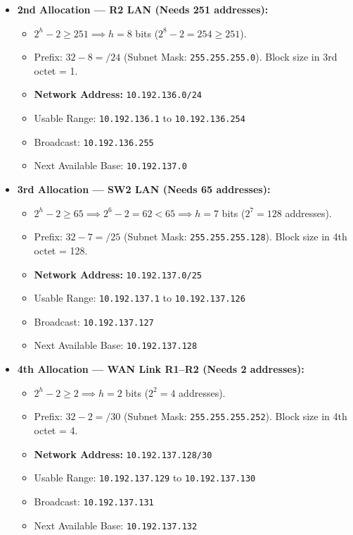 \documentclass[11pt,a4paper]{article}
\begin{document}
\begin{enumerate}
\begin{itemize}
        \item \textbf{2nd Allocation --- R2 LAN (Needs 251 addresses):}
        \begin{itemize}
            \item $2^h - 2 \ge 251 \implies h = 8$ bits ($2^8 - 2 = 254 \ge 251$).
            \item Prefix: $32 - 8 = /24$ (Subnet Mask: \texttt{255.255.255.0}). Block size in 3rd octet = 1.
            \item \textbf{Network Address:} \texttt{10.192.136.0/24}
            \item Usable Range: \texttt{10.192.136.1} to \texttt{10.192.136.254}
            \item Broadcast: \texttt{10.192.136.255}
            \item Next Available Base: \texttt{10.192.137.0}
        \end{itemize}

        \item \textbf{3rd Allocation --- SW2 LAN (Needs 65 addresses):}
        \begin{itemize}
            \item $2^h - 2 \ge 65 \implies 2^6 - 2 = 62 < 65 \implies h = 7$ bits ($2^7 = 128$ addresses).
            \item Prefix: $32 - 7 = /25$ (Subnet Mask: \texttt{255.255.255.128}). Block size in 4th octet = 128.
            \item \textbf{Network Address:} \texttt{10.192.137.0/25}
            \item Usable Range: \texttt{10.192.137.1} to \texttt{10.192.137.126}
            \item Broadcast: \texttt{10.192.137.127}
            \item Next Available Base: \texttt{10.192.137.128}
        \end{itemize}

        \item \textbf{4th Allocation --- WAN Link R1--R2 (Needs 2 addresses):}
        \begin{itemize}
            \item $2^h - 2 \ge 2 \implies h = 2$ bits ($2^2 = 4$ addresses).
            \item Prefix: $32 - 2 = /30$ (Subnet Mask: \texttt{255.255.255.252}). Block size in 4th octet = 4.
            \item \textbf{Network Address:} \texttt{10.192.137.128/30}
            \item Usable Range: \texttt{10.192.137.129} to \texttt{10.192.137.130}
            \item Broadcast: \texttt{10.192.137.131}
            \item Next Available Base: \texttt{10.192.137.132}
        \end{itemize}


\end{itemize}
\end{enumerate}
\end{document}
